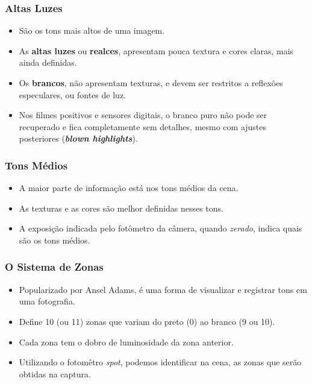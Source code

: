 
\begin{frame}
    \frametitle{Altas Luzes}
    \begin{itemize}
      \item São os tons mais altos de uma imagem.
      \item As \textbf{altas luzes} ou \textbf{realces}, apresentam pouca textura e cores
      claras, mais ainda definidas.
      \item Os \textbf{brancos}, não apresentam texturas, e devem ser restritos a
      reflexões especulares, ou fontes de luz.
      \item Nos filmes positivos e sensores digitais, o branco puro não pode ser
      recuperado e fica completamente sem detalhes, mesmo com ajustes posteriores
      (\textbf{\textit{blown highlights}}).
    \end{itemize}
\end{frame}


\begin{frame}
    \frametitle{Tons Médios}
    \begin{itemize}
      \item A maior parte de informação está nos tons médios da cena.
      \item As texturas e as cores são melhor definidas nesses tons.
      \item A exposição indicada pelo fotômetro da câmera, quando \textit{zerado},
      indica quais são os tons médios.
    \end{itemize}
\end{frame}


\begin{frame}
    \frametitle{O Sistema de Zonas}
    \begin{itemize}
      \item Popularizado por Ansel Adams, é uma forma de visualizar e registrar
      tons em uma fotografia.
      \item Define 10 (ou 11) zonas que variam do preto (0) ao branco (9 ou 10).
      \item Cada zona tem o dobro de luminosidade da zona anterior.
      \item Utilizando o fotomêtro \textit{spot}, podemos identificar na cena, as
      zonas que serão obtidas na captura.
    \end{itemize}
\end{frame}

